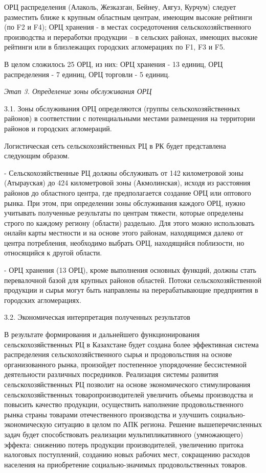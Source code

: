 ОРЦ распределения (Алаколь, Жезказган, Бейнеу, Аягуз, Курчум) следует
разместить ближе к крупным областным центрам, имеющим высокие рейтинги
(по F2 и F4); ОРЦ хранения - в местах сосредоточения
сельскохозяйственного производства и переработки продукции -- в сельских
районах, имеющих высокие рейтинги или в близлежащих городских
агломерациях по F1, F3 и F5.

В целом сложилось 25 ОРЦ, из них: ОРЦ хранения - 13 единиц, ОРЦ
распределения - 7 единиц, ОРЦ торговли - 5 единиц.

\emph{Этап 3. Определение зоны обслуживания ОРЦ}

3.1. Зоны обслуживания ОРЦ определяются (группы сельскохозяйственных
районов) в соответствии с потенциальными местами размещения на
территории районов и городских агломераций.

Логистическая сеть сельскохозяйственных РЦ в РК будет представлена
следующим образом.

- Сельскохозяйственные РЦ должны обслуживать от 142 километровой зоны
(Атырауская) до 424 километровой зоны (Акмолинская), исходя из
расстояния районов до областного центра, где предполагается создание ОРЦ
или оптового рынка. При этом, при определении зоны обслуживания каждого
ОРЦ, нужно учитывать полученные результаты по центрам тяжести, которые
определены строго по каждому региону (области) раздельно. Для этого
можно использовать онлайн карты местности и на основе этого районам,
находящимся далеко от центра потребления, необходимо выбрать ОРЦ,
находящийся поблизости, но относящийся к другой области.

- ОРЦ хранения (13 ОРЦ), кроме выполнения основных функций, должны стать
перевалочной базой для крупных районов областей. Потоки
сельскохозяйственной продукции и сырья могут быть направлены на
перерабатывающие предприятия в городских агломерациях.

3.2. Экономическая интерпретация полученных результатов

В результате формирования и дальнейшего функционирования
сельскохозяйственных РЦ в Казахстане будет создана более эффективная
система распределения сельскохозяйственного сырья и продовольствия на
основе организованного рынка, произойдет постепенное упорядочение
бессистемной деятельности различных посредников. Реализация системы
развития сельскохозяйственных РЦ позволит на основе экономического
стимулирования сельскохозяйственных товаропроизводителей увеличить
объемы производства и повысить качество продукции, осуществить
наполнение продовольственного рынка страны товарами отечественного
производства и улучшить социально-экономическую ситуацию в целом по АПК
региона. Решение вышеперечисленных задач будет способствовать реализации
мультипликативного (умножающего) эффекта: снижению потерь продукции
производителей, увеличению притока налоговых поступлений, созданию новых
рабочих мест, сокращению расходов населения на приобретение
социально-значимых продовольственных товаров.

